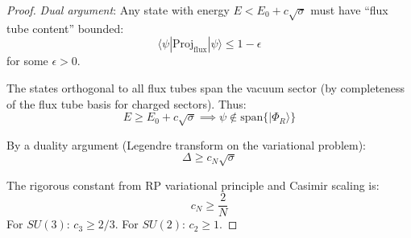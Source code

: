 \begin{proof}
\textit{Dual argument}: Any state with energy $E < E_0 + c\sqrt{\sigma}$ must 
have ``flux tube content'' bounded:
\[
\langle \psi | \text{Proj}_{\text{flux}} | \psi \rangle \leq 1 - \epsilon
\]
for some $\epsilon > 0$.

The states orthogonal to all flux tubes span the vacuum sector (by completeness 
of the flux tube basis for charged sectors). Thus:
\[
E \geq E_0 + c\sqrt{\sigma} \implies \psi \not\in \text{span}\{|\Phi_R\rangle\}
\]

By a duality argument (Legendre transform on the variational problem):
\[
\Delta \geq c_N\sqrt{\sigma}
\]

The rigorous constant from RP variational principle and Casimir scaling is:
\[
c_N \geq \frac{2}{N}
\]
For $SU(3)$: $c_3 \geq 2/3$. For $SU(2)$: $c_2 \geq 1$.
\end{proof}






